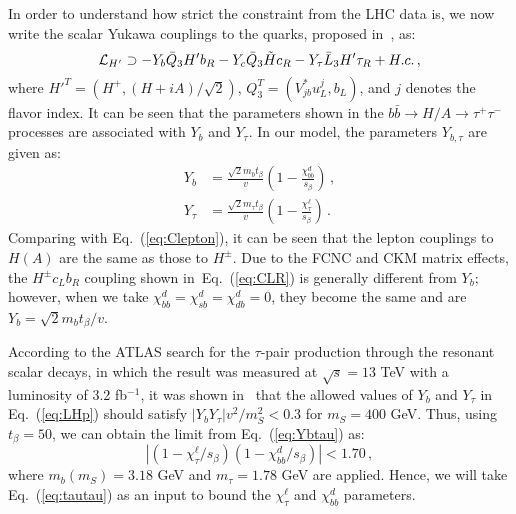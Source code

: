 \documentclass[prd,preprint,superscriptaddress,amsmath,amssymb]{revtex4}
\begin{document}
 
 In order to understand how strict the constraint from the LHC data is, we now write the scalar Yukawa couplings to the quarks, proposed in~\cite{Faroughy:2016osc}, as:
  \begin{equation}
  {\cal L}_{H'} \supset -Y_b \bar Q_3 H' b_R -Y_c \bar Q_3 \tilde H c_R - Y_{\tau} \bar L_3 H' \tau_R + H.c.\,, \label{eq:LHp}
  \end{equation}
where $H'^T=(H^+, (H + i A)/\sqrt{2})$, $Q^T_3=(V^*_{jb} u^j_{L}, b_L)$, and $j$ denotes the  flavor index. 
  It can be seen that the  parameters shown in the $b\bar{b} \to H/A \to \tau^+ \tau^-$ processes are associated with  $Y_b$ and $Y_\tau$.  In our model, the parameters $Y_{b,\tau}$  are  given as:
   \begin{align}
   Y_b & = \frac{\sqrt{2} m_b t_\beta}{v} \left( 1-\frac{\chi^d_{bb}}{s_\beta} \right)\,, \nonumber \\
   Y_\tau & = \frac{\sqrt{2} m_\tau t_\beta}{v} \left(1- \frac{\chi^{\ell}_{\tau}}{s_\beta} \right)\,. \label{eq:Ybtau}
   \end{align}
  Comparing with Eq.~(\ref{eq:Clepton}), it can be seen that the lepton couplings to $H(A)$ are the same as those to $H^\pm$. Due to the FCNC and CKM matrix effects, the $H^\pm c_L b_R$ coupling shown in~Eq.~(\ref{eq:CLR}) is generally different  from $Y_b$; however, when we take $\chi^d_{bb}=\chi^d_{sb}=\chi^d_{db}=0$, they become the same and are $Y_b = \sqrt{2} m_b t_\beta/v$. 
 
 According to the ATLAS search for the $\tau$-pair production through the resonant scalar decays,  in which the result was measured at $\sqrt{s}=13$ TeV with a luminosity of 3.2 fb$^{-1}$, it was shown  in~\cite{Faroughy:2016osc} that  the allowed values of $Y_b$ and $Y_\tau$ in Eq.~(\ref{eq:LHp}) should satisfy $|Y_b Y_\tau| v^2/m^2_{S} < 0.3$ for $m_{S}=400$ GeV. Thus,  using $t_\beta=50$, we can obtain the limit from  Eq.~(\ref{eq:Ybtau}) as:
  \begin{equation}
  |(1- \chi^\ell_\tau/s_\beta)(1-\chi^d_{bb}/s_\beta)| < 1.70\,, \label{eq:tautau}
    \end{equation}
    where $m_b(m_{S}) = 3.18$ GeV and $m_\tau = 1.78$ GeV are applied.  Hence, we will take Eq.~(\ref{eq:tautau})  as an input to bound the $\chi^\ell_\tau$ and $\chi^d_{bb}$ parameters. 
    
\end{document}
